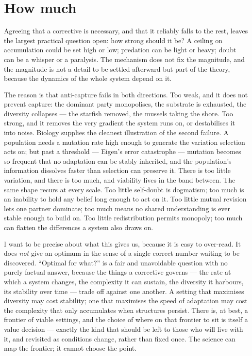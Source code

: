 \documentclass[11pt, a4paper]{report}
\begin{document}
\section{How much}

Agreeing that a corrective is necessary, and that it reliably falls to the rest, leaves the largest practical question open: how strong should it be? A ceiling on accumulation could be set high or low; predation can be light or heavy; doubt can be a whisper or a paralysis. The mechanism does not fix the magnitude, and the magnitude is not a detail to be settled afterward but part of the theory, because the dynamics of the whole system depend on it.

The reason is that anti-capture fails in both directions. Too weak, and it does not prevent capture: the dominant party monopolises, the substrate is exhausted, the diversity collapses --- the starfish removed, the mussels taking the shore. Too strong, and it removes the very gradient the system runs on, or destabilises it into noise. Biology supplies the cleanest illustration of the second failure. A population needs a mutation rate high enough to generate the variation selection acts on; but past a threshold --- Eigen's error catastrophe --- mutation becomes so frequent that no adaptation can be stably inherited, and the population's information dissolves faster than selection can preserve it. There is too little variation, and there is too much, and viability lives in the band between. The same shape recurs at every scale. Too little self-doubt is dogmatism; too much is an inability to hold any belief long enough to act on it. Too little mutual revision lets one partner dominate; too much means no shared understanding is ever stable enough to build on. Too little redistribution permits monopoly; too much can flatten the differences a system also draws on.

I want to be precise about what this gives us, because it is easy to over-read. It does \textit{not} give an optimum in the sense of a single correct number waiting to be discovered. ``Optimal for what?'' is a fair and unavoidable question with no purely factual answer, because the things a corrective governs --- the rate at which a system changes, the complexity it can sustain, the diversity it harbours, its stability over time --- trade off against one another. A setting that maximises diversity may cost stability; one that maximises the speed of adaptation may cost the complexity that only accumulates when structures persist. There is, at best, a frontier of viable settings, and the choice of where on that frontier to sit is itself a value decision --- exactly the kind that should be left to those who will live with it, and revisited as conditions change, rather than fixed once. The science can map the frontier; it cannot choose the point.
\end{document}
